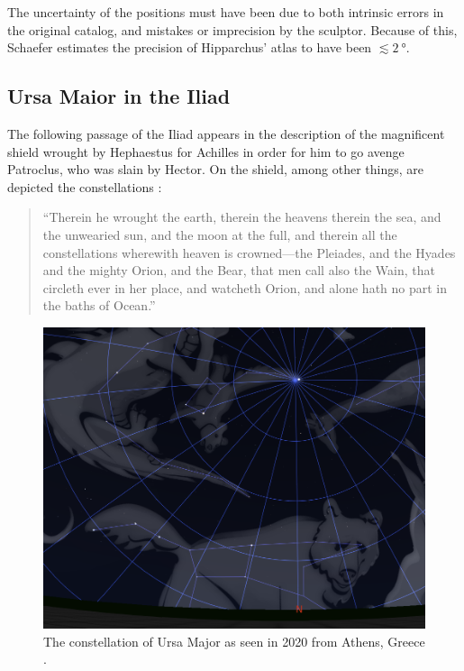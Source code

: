 \documentclass[main.tex]{subfiles}
\begin{document}
The uncertainty of the positions must have been due to both intrinsic errors in the original catalog, and mistakes or imprecision by the sculptor.
Because of this, Schaefer estimates the precision of Hipparchus' atlas to have been \(\lesssim \SI{2}{\degree}\).

\subsection{Ursa Maior in the Iliad}

The following passage of the Iliad appears in the description of the magnificent shield wrought by Hephaestus for Achilles in order for him to go avenge Patroclus, who was slain by Hector.
On the shield, among other things, are depicted the constellations \cite[XVIII, 483--490]{murrayIliad1924}: 
%
\begin{quotation}
``Therein he wrought the earth, therein the heavens therein the sea, and the unwearied sun, and the moon at the full, and therein all the constellations wherewith heaven is crowned—the Pleiades, and the Hyades and the mighty Orion, and the Bear, that men call also the Wain, that circleth ever in her place, and watcheth Orion, and alone hath no part in the baths of Ocean.''
\end{quotation}

\begin{figure}[ht]
\centering
\includegraphics[width=\textwidth]{figures/ursa_maior_today.png}
\caption{The constellation of Ursa Major as seen in 2020 from Athens, Greece \cite[]{stellariumcontributorsStellariumAstronomySoftware2020}.}
\label{fig:ursa-now}
\end{figure}
\end{document}
